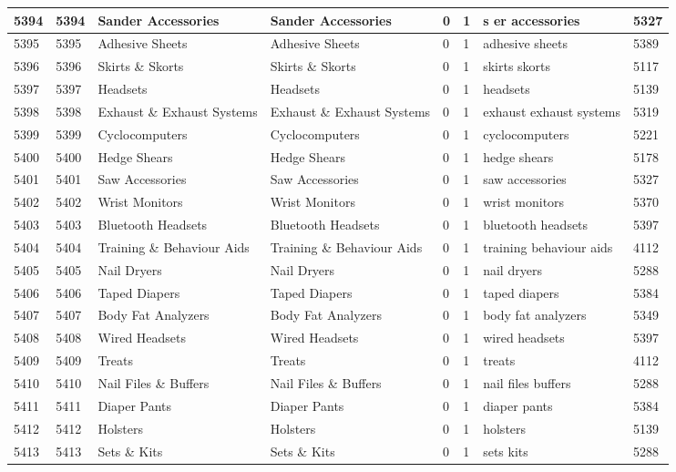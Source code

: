 \begin{longtable}{|l|l|l|l|l|l|l|l|}
5394 & 5394 & Sander Accessories & Sander Accessories & 0 & 1 & s er accessories & 5327 \\ \hline 
5395 & 5395 & Adhesive Sheets & Adhesive Sheets & 0 & 1 & adhesive sheets & 5389 \\ \hline 
5396 & 5396 & Skirts \& Skorts & Skirts \& Skorts & 0 & 1 & skirts skorts & 5117 \\ \hline 
5397 & 5397 & Headsets & Headsets & 0 & 1 & headsets & 5139 \\ \hline 
5398 & 5398 & Exhaust \& Exhaust Systems & Exhaust \& Exhaust Systems & 0 & 1 & exhaust exhaust systems & 5319 \\ \hline 
5399 & 5399 & Cyclocomputers & Cyclocomputers & 0 & 1 & cyclocomputers & 5221 \\ \hline 
5400 & 5400 & Hedge Shears & Hedge Shears & 0 & 1 & hedge shears & 5178 \\ \hline 
5401 & 5401 & Saw Accessories & Saw Accessories & 0 & 1 & saw accessories & 5327 \\ \hline 
5402 & 5402 & Wrist Monitors & Wrist Monitors & 0 & 1 & wrist monitors & 5370 \\ \hline 
5403 & 5403 & Bluetooth Headsets & Bluetooth Headsets & 0 & 1 & bluetooth headsets & 5397 \\ \hline 
5404 & 5404 & Training \& Behaviour Aids & Training \& Behaviour Aids & 0 & 1 & training behaviour aids & 4112 \\ \hline 
5405 & 5405 & Nail Dryers & Nail Dryers & 0 & 1 & nail dryers & 5288 \\ \hline 
5406 & 5406 & Taped Diapers & Taped Diapers & 0 & 1 & taped diapers & 5384 \\ \hline 
5407 & 5407 & Body Fat Analyzers & Body Fat Analyzers & 0 & 1 & body fat analyzers & 5349 \\ \hline 
5408 & 5408 & Wired Headsets & Wired Headsets & 0 & 1 & wired headsets & 5397 \\ \hline 
5409 & 5409 & Treats & Treats & 0 & 1 & treats & 4112 \\ \hline 
5410 & 5410 & Nail Files \& Buffers & Nail Files \& Buffers & 0 & 1 & nail files buffers & 5288 \\ \hline 
5411 & 5411 & Diaper Pants & Diaper Pants & 0 & 1 & diaper pants & 5384 \\ \hline 
5412 & 5412 & Holsters & Holsters & 0 & 1 & holsters & 5139 \\ \hline 
5413 & 5413 & Sets \& Kits & Sets \& Kits & 0 & 1 & sets kits & 5288 \\ \hline 

\end{longtable}
